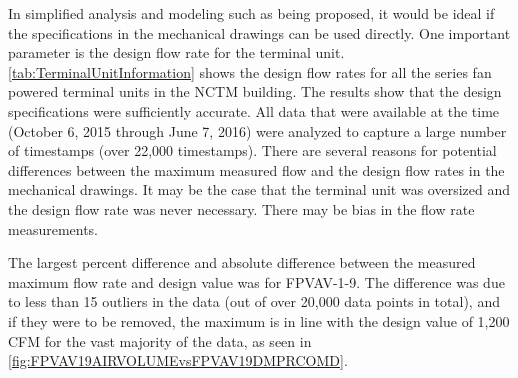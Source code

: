 In simplified analysis and modeling such as being proposed, it would be
ideal if the specifications in the mechanical drawings can be used
directly.  One important parameter is the design flow rate for the
terminal unit.  \tableref \ref{tab:TerminalUnitInformation} shows the
design flow rates for all the series fan powered terminal units in the
NCTM building.  The results show that the design specifications were
sufficiently accurate.  All data that were available at the time
(October 6, 2015 through June 7, 2016) were analyzed to capture a large
number of timestamps (over 22,000 timestamps).  There are several
reasons for potential differences between the maximum measured flow and
the design flow rates in the mechanical drawings.  It may be the case
that the terminal unit was oversized and the design flow rate was never
necessary. There may be bias in the flow rate measurements.  

The largest percent difference and absolute difference between the
measured maximum flow rate and design value was for FPVAV-1-9. The
difference was due to less than 15 outliers in the data (out of over
20,000 data points in total), and if they were to be removed, the
maximum is in line with the design value of 1,200 CFM for the vast
majority of the data, as seen in \figref{}
\ref{fig:FPVAV19AIRVOLUMEvsFPVAV19DMPRCOMD}. 

